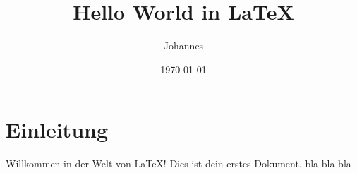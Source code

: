 \documentclass{article}
\title{Hello World in LaTeX}
\author{Johannes}
\date{\today}               %
\begin{document}
\maketitle

\section{Einleitung}
Willkommen in der Welt von \LaTeX! Dies ist dein erstes Dokument.
bla bla bla
\end{document}
